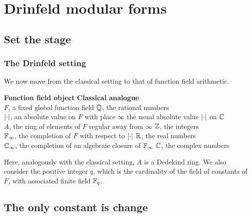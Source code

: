 \section{Drinfeld modular forms}


\subsection{Set the stage}

\begin{frame} \frametitle{The Drinfeld setting}
  We now move from the classical setting to that of function field arithmetic.

   \textbf{Function field object} \hfill \textbf{Classical analogue} \pause \\
   $F$, a fixed global function field \hfill $\mathbb{Q}$, the rational numbers \pause \\
   $\left\lvert\cdot\right\rvert$, an absolute value on $F$ with place $\infty$ \hfill the usual absolute value $\left\lvert\cdot\right\rvert$ on $\mathbb{C}$ \pause \\
   $A$, the ring of elements of $F$ regular away from $\infty$ \hfill $\mathbb{Z}$, the integers \pause \\
   $\mathbb{F}_\infty$, the completion of $F$ with respect to $\left\lvert\cdot\right\rvert$ \hfill $\mathbb{R}$, the real numbers \pause \\
   $\mathbb{C}_\infty$, the completion of an algebraic closure of $\mathbb{F}_\infty$ \hfill $\mathbb{C}$, the complex numbers \pause

  Here, analogously with the classical setting, $A$ is a Dedekind ring.
  We also consider the positive integer $q$, which is the cardinality of the field of constants of $F$, with associated finite field $\mathbb{F}_q$.
\end{frame}


\subsection{The only constant is change}

